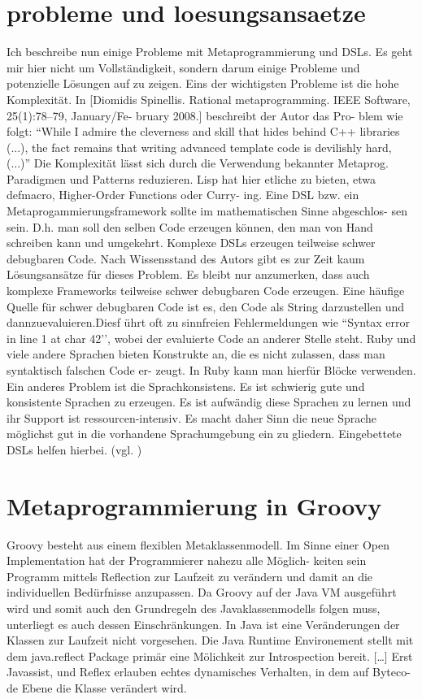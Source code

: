 \documentclass[11pt,english,ngerman, headsepline]{scrreprt}
\begin{document}
\section{probleme und loesungsansaetze} 
Ich beschreibe nun einige Probleme mit Metaprogrammierung und DSLs. Es geht mir
hier nicht um Vollständigkeit, sondern darum einige Probleme und potenzielle
Lösungen auf zu zeigen.
Eins der wichtigsten Probleme ist die hohe Komplexität. In [Diomidis Spinellis.
Rational metaprogramming. IEEE Software, 25(1):78–79, January/Fe- bruary 2008.]
beschreibt der Autor das Pro- blem wie folgt:
“While I admire the cleverness and skill that hides behind C++ libraries (...),
the fact remains that writing advanced template code is devilishly hard, (...)”
Die Komplexität lässt sich durch die Verwendung bekannter Metaprog. Paradigmen
und Patterns reduzieren. Lisp hat hier etliche zu bieten, etwa defmacro,
Higher-Order Functions oder Curry- ing.
Eine DSL bzw. ein Metaprogammierungsframework sollte im mathematischen Sinne
abgeschlos- sen sein. D.h. man soll den selben Code erzeugen können, den man von
Hand schreiben kann und umgekehrt.
Komplexe DSLs erzeugen teilweise schwer debugbaren Code. Nach Wissensstand des
Autors gibt es zur Zeit kaum Lösungsansätze für dieses Problem.
Es bleibt nur anzumerken, dass auch komplexe Frameworks teilweise schwer
debugbaren Code erzeugen.
Eine häufige Quelle für schwer debugbaren Code ist es, den Code als String
darzustellen und dannzuevaluieren.Diesf ührt oft zu sinnfreien Fehlermeldungen
wie “Syntax error in line 1 at char 42’’, wobei der evaluierte Code an anderer
Stelle steht. Ruby und viele andere Sprachen bieten Konstrukte an, die es nicht
zulassen, dass man syntaktisch falschen Code er- zeugt. In Ruby kann man hierfür
Blöcke verwenden.
Ein anderes Problem ist die Sprachkonsistens. Es ist schwierig gute und
konsistente Sprachen zu erzeugen. Es ist aufwändig diese Sprachen zu lernen und
ihr Support ist ressourcen-intensiv. Es macht daher Sinn die neue Sprache
möglichst gut in die vorhandene Sprachumgebung ein zu gliedern. Eingebettete
DSLs helfen hierbei.
(vgl. \cite{biekermetaprogrammierung})

\section{Metaprogrammierung in Groovy}
Groovy besteht aus einem flexiblen Metaklassenmodell. Im Sinne einer Open
Implementation hat der Programmierer nahezu alle Möglich- keiten sein Programm
mittels Reflection zur Laufzeit zu verändern und damit an die individuellen
Bedürfnisse anzupassen. \cite{mpInGroovy} Da Groovy auf der Java VM ausgeführt
wird und somit auch den Grundregeln des Javaklassenmodells folgen muss,
unterliegt es auch dessen Einschränkungen. In Java ist eine Veränderungen der
Klassen zur Laufzeit nicht vorgesehen. Die Java Runtime Environement stellt mit
dem java.reflect Package primär eine Mölichkeit zur Introspection bereit.
[\ldots] 
Erst Javassist, und Reflex erlauben echtes dynamisches
Verhalten, in dem auf Byteco- de Ebene die Klasse verändert wird. 
\end{document}
